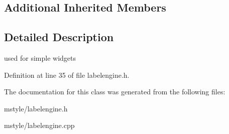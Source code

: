 \subsection*{Additional Inherited Members}


\subsection{Detailed Description}
used for simple widgets 

Definition at line 35 of file labelengine.\+h.



The documentation for this class was generated from the following files\+:\begin{DoxyCompactItemize}
\item 
mstyle/labelengine.\+h\item 
mstyle/labelengine.\+cpp\end{DoxyCompactItemize}
